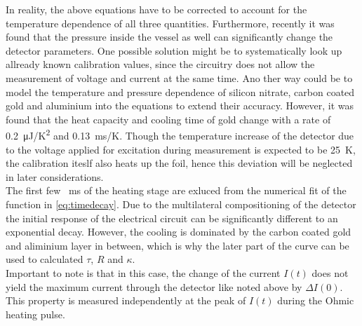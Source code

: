 \documentclass[
    aps,%
    twocolumn,%
    secnumarabic,%
    amssymb,%
    prd,%
    10pt%
    ]{revtex4-1}
\begin{document}
    In reality, the above equations have to be corrected to account for the temperature dependence of all three quantities. Furthermore, recently it was found that the pressure inside the vessel as well can significantly change the detector parameters. One possible solution might be to systematically look up allready known calibration values, since the circuitry does not allow the measurement of voltage and current at the same time. Ano ther way could be to model the temperature and pressure dependence of silicon nitrate, carbon coated gold and aluminium into the equations to extend their accuracy. However, it was found that the heat capacity and cooling time of gold change with a rate of \mbox{\SI{0.2}{\micro\joule/\kelvin\squared}} and \mbox{\SI{0.13}{\milli\second/\kelvin}.} Though the temperature increase of the detector due to the voltage applied for excitation during measurement is expected to be \mbox{\SI{25}{\kelvin},} the calibration iteslf also heats up the foil, hence this deviation will be neglected in later considerations.\\%
    The first few \mbox{\SI{}{\milli\second}} of the heating stage are exluced from the numerical fit of the function in \cref{eq:timedecay}. Due to the multilateral compositioning of the detector the initial response of the electrical circuit can be significantly different to an exponential decay. However, the cooling is dominated by the carbon coated gold and aliminium layer in between, which is why the later part of the curve can be used to calculated $\tau$, $R$ and $\kappa$.\\%
    Important to note is that in this case, the change of the current \mbox{$I\left(t\right)$} does not yield the maximum current through the detector like noted above by \mbox{$\Delta I\left(0\right)$.} This property is measured independently at the peak of \mbox{$I\left(t\right)$} during the Ohmic heating pulse.
\end{document}
